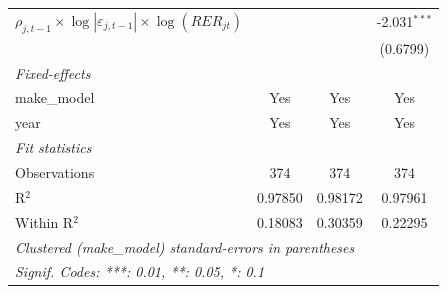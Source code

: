 \begin{table}[htbp]
\begin{tabular}{lccc}
      $\rho_{j,t-1}\times\log|\varepsilon_{j,t-1}|\times\log(RER_{jt})$       &                &                & -2.031$^{***}$\\
                                                                              &                &                & (0.6799)\\
      \midrule
      \emph{Fixed-effects}\\
      make\_model                                                             & Yes            & Yes            & Yes\\
      year                                                                    & Yes            & Yes            & Yes\\
      \midrule
      \emph{Fit statistics}\\
      Observations                                                            & 374            & 374            & 374\\
      R$^2$                                                                   & 0.97850        & 0.98172        & 0.97961\\
      Within R$^2$                                                            & 0.18083        & 0.30359        & 0.22295\\
      \midrule \midrule
      \multicolumn{4}{l}{\emph{Clustered (make\_model) standard-errors in parentheses}}\\
      \multicolumn{4}{l}{\emph{Signif. Codes: ***: 0.01, **: 0.05, *: 0.1}}\\
   \end{tabular}
\end{table}


